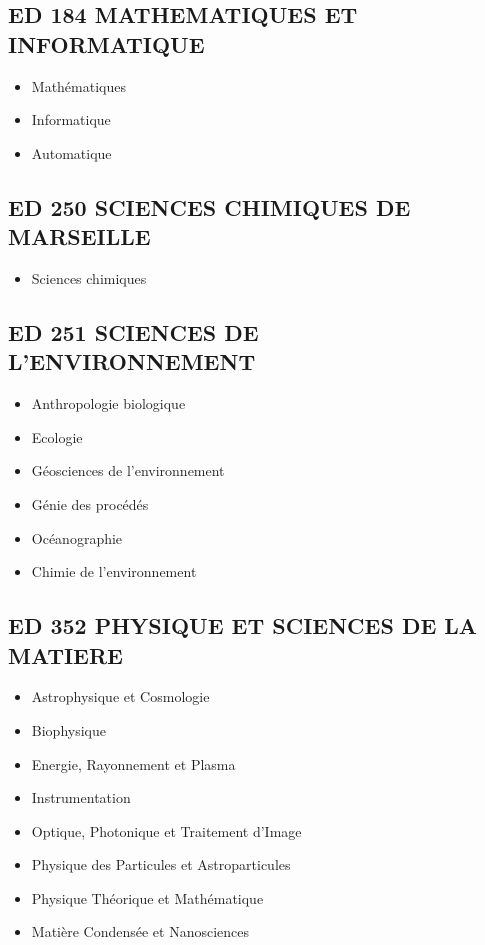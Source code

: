 \subsection*{ED 184 MATHEMATIQUES ET INFORMATIQUE}\label{ed-184-mathematiques-et-informatique}

\begin{itemize}
\item Mathématiques
\item Informatique
\item Automatique
\end{itemize}

\subsection*{ED 250 SCIENCES CHIMIQUES DE MARSEILLE}\label{ed-250-sciences-chimiques-de-marseille}

\begin{itemize}
\item Sciences chimiques
\end{itemize}

\subsection*{ED 251 SCIENCES DE L'ENVIRONNEMENT}\label{ed-251-sciences-de-lenvironnement}

\begin{itemize}
\item Anthropologie biologique
\item Ecologie
\item Géosciences de l'environnement
\item Génie des procédés
\item Océanographie
\item Chimie de l'environnement
\end{itemize}

\subsection*{ED 352 PHYSIQUE ET SCIENCES DE LA MATIERE}\label{ed-352-physique-et-sciences-de-la-matiere}

\begin{itemize}
\item Astrophysique et Cosmologie
\item Biophysique
\item Energie, Rayonnement et Plasma
\item Instrumentation
\item Optique, Photonique et Traitement d'Image
\item Physique des Particules et Astroparticules
\item Physique Théorique et Mathématique
\item Matière Condensée et Nanosciences
\end{itemize}

